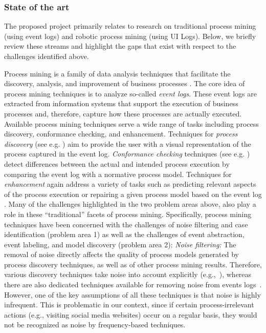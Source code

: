  
\subsubsection{State of the art} 
 \label{sec:stateoftheart}
 
The proposed project primarily relates to research on traditional process mining (using event logs) and robotic process mining (using UI Logs). Below, we briefly review these streams and highlight the gaps that exist with respect to the challenges identified above.  

 Process mining is a family of data analysis techniques that facilitate the discovery, analysis, and improvement of business processes \cite{van2016data}. The core idea of process mining techniques is to analyze so-called \textit{event logs}. These event logs are extracted from information systems that support the execution of business processes and, therefore, capture how these processes are actually executed. Available process mining techniques serve a wide range of tasks including process discovery, conformance checking, and enhancement. Techniques for \textit{process discovery} (see e.g. \cite{gunther2007fuzzy,weijters2011flexible,leemans2013discovering}) aim to provide the user with a visual representation of the process captured in the event log. \textit{Conformance checking} techniques (see e.g. \cite{rozinat2008conformance,adriansyah2011conformance}) detect differences between the actual and intended process execution by comparing the event log with a normative process model. Techniques for \textit{enhancement} again address a variety of tasks such as predicting relevant aspects of the process execution \cite{di2018predictive} or repairing a given process model based on the event log \cite{polyvyanyy2016impact}. Many of the challenges highlighted in the two problem areas above, also play a role in these ``traditional'' facets of process mining. Specifically, process mining techniques have been concerned with the challenges of noise filtering and case identification (problem area 1) as well as the challenges of event abstraction, event labeling, and model discovery (problem area 2):
\vspace{0.2em}
\newline%
\noindent \textit{Noise filtering:} The removal of noise directly affects the quality of process models generated by process discovery techniques, as well as of other process mining results. 
Therefore, various discovery techniques take noise into account explicitly (e.g.,~\cite{weijters2003rediscovering,leemans2013discovering,van2016avoiding}), whereas there are also dedicated techniques available  for removing noise from events logs~\cite{tax2017discovering,CHENG2015138}. However, one of the key assumptions of all these techniques is that noise is highly infrequent. This is problematic in our context, since if certain process-irrelevant actions (e.g., visiting social media websites) occur on a regular basis, they would not be recognized as noise by frequency-based techniques. 
